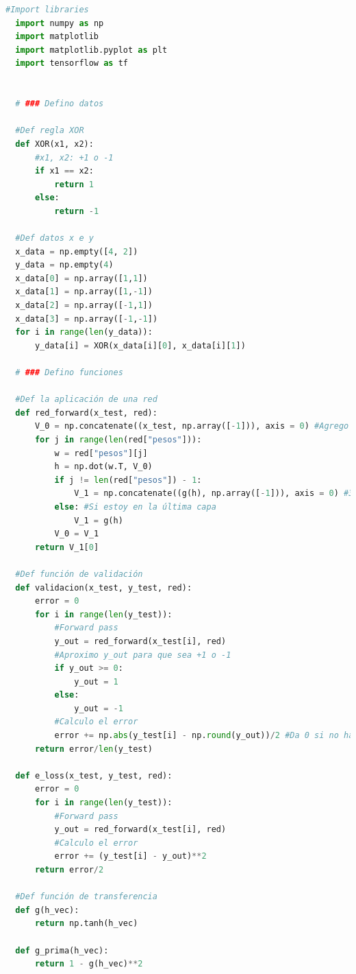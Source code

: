 \documentclass[aps,prb,twocolumn,superscriptaddress,floatfix,longbibliography]{revtex4-2}
\newcounter{para}
\begin{document}
\begin{lstlisting}[language=Python]
  #Import libraries
  import numpy as np
  import matplotlib
  import matplotlib.pyplot as plt
  import tensorflow as tf
  
  
  # ### Defino datos
  
  #Def regla XOR
  def XOR(x1, x2):
      #x1, x2: +1 o -1
      if x1 == x2:
          return 1
      else:
          return -1
  
  #Def datos x e y
  x_data = np.empty([4, 2])
  y_data = np.empty(4)
  x_data[0] = np.array([1,1])
  x_data[1] = np.array([1,-1])
  x_data[2] = np.array([-1,1])
  x_data[3] = np.array([-1,-1])
  for i in range(len(y_data)):
      y_data[i] = XOR(x_data[i][0], x_data[i][1])
  
  # ### Defino funciones
  
  #Def la aplicación de una red
  def red_forward(x_test, red):
      V_0 = np.concatenate((x_test, np.array([-1])), axis = 0) #Agrego el bias 3x1
      for j in range(len(red["pesos"])):
          w = red["pesos"][j]
          h = np.dot(w.T, V_0)
          if j != len(red["pesos"]) - 1:
              V_1 = np.concatenate((g(h), np.array([-1])), axis = 0) #3x1
          else: #Si estoy en la última capa
              V_1 = g(h)
          V_0 = V_1
      return V_1[0]
  
  #Def función de validación
  def validacion(x_test, y_test, red):
      error = 0
      for i in range(len(y_test)):
          #Forward pass
          y_out = red_forward(x_test[i], red)
          #Aproximo y_out para que sea +1 o -1
          if y_out >= 0:
              y_out = 1
          else:
              y_out = -1
          #Calculo el error
          error += np.abs(y_test[i] - np.round(y_out))/2 #Da 0 si no hay error y 1 si hay error
      return error/len(y_test)
  
  def e_loss(x_test, y_test, red):
      error = 0
      for i in range(len(y_test)):
          #Forward pass
          y_out = red_forward(x_test[i], red)
          #Calculo el error
          error += (y_test[i] - y_out)**2
      return error/2
  
  #Def función de transferencia
  def g(h_vec):
      return np.tanh(h_vec)
  
  def g_prima(h_vec):
      return 1 - g(h_vec)**2
  

\end{lstlisting}
\end{document}
